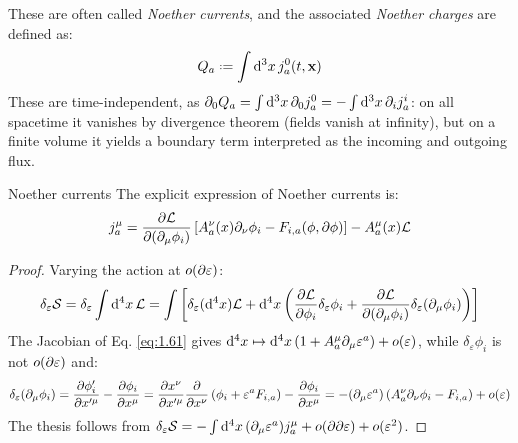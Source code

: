 These are often called \textit{Noether currents}, and the associated \textit{Noether charges} are defined as:
\begin{equation}
  Q_a \defeq \int \dd^3 x\, j^0_a(t,\ve{x})
  \label{eq:1.67}
\end{equation}
These are time-independent, as $ \partial_0 Q_a = \int \mathrm{d}^3 x\, \partial_0 j^0_a = - \int \mathrm{d}^3 x\, \partial_i j^i_a $: on all spacetime it vanishes by divergence theorem (fields vanish at infinity), but on a finite volume it yields a boundary term interpreted as the incoming and outgoing flux.

\begin{proposition}{Noether currents}{}
  The explicit expression of Noether currents is:
  \begin{equation}
    j^\mu_a = \frac{\partial \mathcal{L}}{\partial (\partial_\mu \phi_i)} \left[ A^\nu_a(x) \partial_\nu \phi_i - F_{i,a}(\phi, \partial \phi) \right] - A^\mu_a(x) \mathcal{L}
    \label{eq:1.68}
  \end{equation}

  \tcblower

  \begin{proof}
    Varying the action at $ o(\partial \varepsilon) $:
    \begin{equation*}
        \delta_\varepsilon \mathcal{S} = \delta_\varepsilon \int \mathrm{d}^4 x\, \mathcal{L} = \int \left[ \delta_\varepsilon (\mathrm{d}^4 x) \mathcal{L} + \mathrm{d}^4 x \left( \frac{\partial \mathcal{L}}{\partial \phi_i} \delta_\varepsilon \phi_i + \frac{\partial \mathcal{L}}{\partial (\partial_\mu \phi_i)} \delta_\varepsilon (\partial_\mu \phi_i) \right) \right]
    \end{equation*}
    The Jacobian of Eq. \ref{eq:1.61} gives $ \mathrm{d}^4 x \mapsto \mathrm{d}^4 x \left( 1 + A^\mu_a \partial_\mu \varepsilon^a \right) + o(\varepsilon) $, while $ \delta_\varepsilon \phi_i $ is not $ o(\partial \varepsilon) $ and:
    \begin{equation*}
      \delta_\varepsilon (\partial_\mu \phi_i) = \frac{\partial \phi'_i}{\partial x'^\mu} - \frac{\partial \phi_i}{\partial x^\mu} = \frac{\partial x^\nu}{\partial x'^\mu} \frac{\partial}{\partial x^\nu} \left( \phi_i + \varepsilon^a F_{i,a} \right) - \frac{\partial \phi_i}{\partial x^\mu} = - (\partial_\mu \varepsilon^a) \left( A^\nu_a \partial_\nu \phi_i - F_{i,a} \right) + o(\varepsilon)
    \end{equation*}
    The thesis follows from $ \delta_\varepsilon \mathcal{S} = - \int \mathrm{d}^4 x\, (\partial_\mu \varepsilon^a) j^\mu_a + o(\partial \partial \varepsilon) + o(\varepsilon^2) $.
  \end{proof}
\end{proposition}

